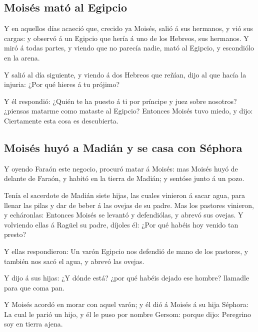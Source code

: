 \hypertarget{moisuxe9s-matuxf3-al-egipcio}{%
\subsection{Moisés mató al Egipcio}\label{moisuxe9s-matuxf3-al-egipcio}}

 Y en aquellos días acaeció que, crecido ya Moisés, salió á
sus hermanos, y vió sus cargas: y observó á un Egipcio que hería á uno
de los Hebreos, sus hermanos.  Y miró á todas partes, y
viendo que no parecía nadie, mató al Egipcio, y escondiólo en la arena.

 Y salió al día siguiente, y viendo á dos Hebreos que
reñían, dijo al que hacía la injuria: ¿Por qué hieres á tu prójimo?

 Y él respondió: ¿Quién te ha puesto á ti por príncipe y
juez sobre nosotros? ¿piensas matarme como mataste al Egipcio? Entonces
Moisés tuvo miedo, y dijo: Ciertamente esta cosa es descubierta.

\hypertarget{moisuxe9s-huyuxf3-a-madiuxe1n-y-se-casa-con-suxe9phora}{%
\subsection{Moisés huyó a Madián y se casa con
Séphora}\label{moisuxe9s-huyuxf3-a-madiuxe1n-y-se-casa-con-suxe9phora}}

 Y oyendo Faraón este negocio, procuró matar á Moisés: mas
Moisés huyó de delante de Faraón, y habitó en la tierra de Madián; y
sentóse junto á un pozo.

 Tenía el sacerdote de Madián siete hijas, las cuales
vinieron á sacar agua, para llenar las pilas y dar de beber á las ovejas
de su padre.  Mas los pastores vinieron, y echáronlas:
Entonces Moisés se levantó y defendiólas, y abrevó sus ovejas.
 Y volviendo ellas á Ragüel su padre, díjoles él: ¿Por qué
habéis hoy venido tan presto?

 Y ellas respondieron: Un varón Egipcio nos defendió de
mano de los pastores, y también nos sacó el agua, y abrevó las ovejas.

 Y dijo á sus hijas: ¿Y dónde está? ¿por qué habéis dejado
ese hombre? llamadle para que coma pan.

 Y Moisés acordó en morar con aquel varón; y él dió á
Moisés á su hija Séphora:  La cual le parió un hijo, y él
le puso por nombre Gersom: porque dijo: Peregrino soy en tierra ajena.

